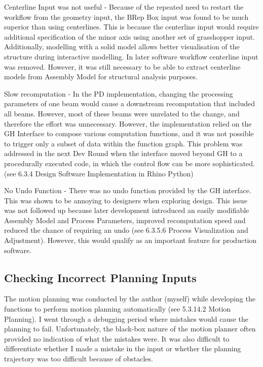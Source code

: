 \begin{itemize}
\begin{enumerate}
Centerline Input was not useful - Because of the repeated need to restart the workflow from the geometry input, the BRep Box input was found to be much superior than using centerlines. This is because the centerline input would require additional specification of the minor axis using another set of grasshopper input. Additionally, modelling with a solid model allows better visualisation of the structure during interactive modelling. In later software workflow centerline input was removed. However, it was still necessary to be able to extract centerline models from Assembly Model for structural analysis purposes.

Slow recomputation - In the PD implementation, changing the processing parameters of one beam would cause a downstream recomputation that included all beams. However, most of these beams were unrelated to the change, and therefore the effort was unnecessary. However, the implementation relied on the GH Interface to compose various computation functions, and it was not possible to trigger only a subset of data within the function graph. This problem was addressed in the next Dev Round when the interface moved beyond GH to a procedurally executed code, in which the control flow can be more sophisticated. (see 6.3.4 Design Software Implementation in Rhino Python)

No Undo Function - There was no undo function provided by the GH interface. This was shown to be annoying to designers when exploring design. This issue was not followed up because later development introduced an easily modifiable Assembly Model and Process Parameters, improved recomputation speed and reduced the chance of requiring an undo (see 6.3.5.6 Process Visualization and Adjustment). However, this would qualify as an important feature for production software. 

\subsection{Checking Incorrect Planning Inputs}
The motion planning was conducted by the author (myself) while developing the functions to perform motion planning automatically (see 5.3.14.2 Motion Planning). I went through a debugging period where mistakes would cause the planning to fail. Unfortunately, the black-box nature of the motion planner often provided no indication of what the mistakes were. It was also difficult to differentiate whether I made a mistake in the input or whether the planning trajectory was too difficult because of obstacles. 


\end{enumerate}
\end{itemize}
